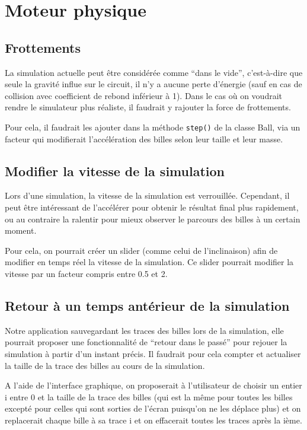 \documentclass{report}
\begin{document}
\section{Moteur physique}

\subsection{Frottements}

La simulation actuelle peut être considérée comme “dans le vide”, c’est-à-dire que seule la gravité influe sur le circuit, il n’y a aucune perte d’énergie (sauf en cas de collision avec coefficient de rebond inférieur à 1). Dans le cas où on voudrait rendre le simulateur plus réaliste, il faudrait y rajouter la force de frottements.

Pour cela, il faudrait les ajouter dans la méthode \texttt{step()} de la classe Ball, via un facteur qui modifierait l’accélération des billes selon leur taille et leur masse.

\subsection{Modifier la vitesse de la simulation}

Lors d’une simulation, la vitesse de la simulation est verrouillée. Cependant, il peut être intéressant de l’accélérer pour obtenir le résultat final plus rapidement, ou au contraire la ralentir pour mieux observer le parcours des billes à un certain moment.

Pour cela, on pourrait créer un slider (comme celui de l’inclinaison) afin de modifier en temps réel la vitesse de la simulation. Ce slider pourrait modifier la vitesse par un facteur compris entre 0.5 et 2.


\subsection{Retour à un temps antérieur de la simulation}

Notre application sauvegardant les traces des billes lors de la simulation, elle pourrait proposer une fonctionnalité de “retour dans le passé” pour rejouer la simulation à partir d’un instant précis. Il faudrait pour cela compter et actualiser la taille de la trace des billes au cours de la simulation. 

A l’aide de l’interface graphique, on proposerait à l’utilisateur de choisir un entier i entre 0 et la taille de la trace des billes (qui est la même pour toutes les billes excepté pour celles qui sont sorties de l’écran puisqu’on ne les déplace plus) et on replacerait chaque bille à sa trace i et on effacerait toutes les traces après la ième.
\end{document}
